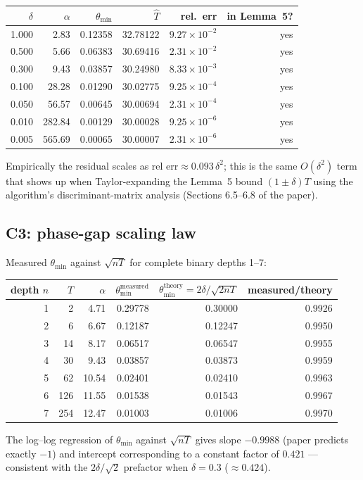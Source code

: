 \documentclass[11pt]{article}
\begin{document}
\begin{table}[ht]
\centering
\small
\begin{tabular}{rrrrrr}
\toprule
$\delta$ & $\alpha$ & $\theta_{\min}$ & $\hat T$ & rel.\ err & in Lemma~5? \\
\midrule
1.000 &   2.83 & 0.12358 & 32.78122 & $9.27\!\times\!10^{-2}$ & yes \\
0.500 &   5.66 & 0.06383 & 30.69416 & $2.31\!\times\!10^{-2}$ & yes \\
0.300 &   9.43 & 0.03857 & 30.24980 & $8.33\!\times\!10^{-3}$ & yes \\
0.100 &  28.28 & 0.01290 & 30.02775 & $9.25\!\times\!10^{-4}$ & yes \\
0.050 &  56.57 & 0.00645 & 30.00694 & $2.31\!\times\!10^{-4}$ & yes \\
0.010 & 282.84 & 0.00129 & 30.00028 & $9.25\!\times\!10^{-6}$ & yes \\
0.005 & 565.69 & 0.00065 & 30.00007 & $2.31\!\times\!10^{-6}$ & yes \\
\bottomrule
\end{tabular}
\end{table}
Empirically the residual scales as $\text{rel err} \approx 0.093\,\delta^2$;
this is the same $O(\delta^2)$ term that shows up when Taylor-expanding the
Lemma~5 bound $(1\pm\delta)T$ using the algorithm's discriminant-matrix
analysis (Sections 6.5--6.8 of the paper).

\subsection*{C3: phase-gap scaling law}
Measured $\theta_{\min}$ against $\sqrt{nT}$ for complete binary depths 1--7:

\begin{table}[ht]
\centering
\small
\begin{tabular}{rrrrrr}
\toprule
depth $n$ & $T$ & $\alpha$ & $\theta_{\min}^{\text{measured}}$ & $\theta_{\min}^{\text{theory}} = 2\delta/\!\sqrt{2nT}$ & measured/theory \\
\midrule
1 &   2 &  4.71 & 0.29778 & 0.30000 & 0.9926 \\
2 &   6 &  6.67 & 0.12187 & 0.12247 & 0.9950 \\
3 &  14 &  8.17 & 0.06517 & 0.06547 & 0.9955 \\
4 &  30 &  9.43 & 0.03857 & 0.03873 & 0.9959 \\
5 &  62 & 10.54 & 0.02401 & 0.02410 & 0.9963 \\
6 & 126 & 11.55 & 0.01538 & 0.01543 & 0.9967 \\
7 & 254 & 12.47 & 0.01003 & 0.01006 & 0.9970 \\
\bottomrule
\end{tabular}
\end{table}
The log--log regression of $\theta_{\min}$ against $\sqrt{nT}$ gives
slope $\mathbf{-0.9988}$ (paper predicts exactly $-1$) and intercept
corresponding to a constant factor of $0.421$ --- consistent with the
$2\delta / \sqrt{2}$ prefactor when $\delta = 0.3$ ($\approx 0.424$).
\end{document}
